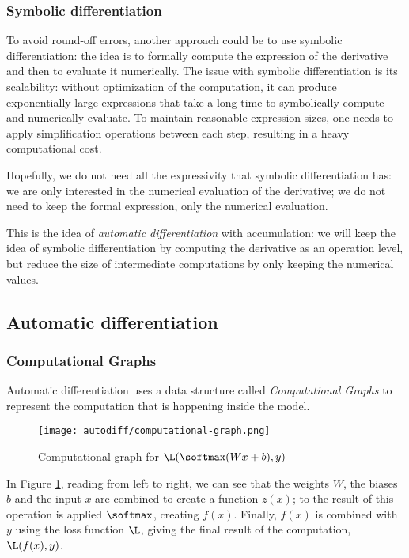 \subsubsection{Symbolic differentiation}
To avoid round-off errors, another approach could be to use symbolic differentiation: the idea is to formally compute the expression of the derivative and then to evaluate it numerically. The issue with symbolic differentiation is its scalability: without optimization of the computation, it can produce exponentially large expressions that take a long time to symbolically compute and numerically evaluate. To maintain reasonable expression sizes, one needs to apply simplification operations between each step, resulting in a heavy computational cost.

Hopefully, we do not need all the expressivity that symbolic differentiation has: we are only interested in the numerical evaluation of the derivative; we do not need to keep the formal expression, only the numerical evaluation.

This is the idea of \emph{automatic differentiation} with accumulation: we will keep the idea of symbolic differentiation by computing the derivative as an operation level, but reduce the size of intermediate computations by only keeping the numerical values.

\subsection{Automatic differentiation}
\subsubsection{Computational Graphs}
Automatic differentiation uses a data structure called \emph{Computational Graphs} to represent the computation that is happening inside the model.
\begin{figure}[H]
    \centering
    \texttt{[image: autodiff/computational-graph.png]}
    \caption{Computational graph for $\L(\softmax(Wx+b), y)$}
    \label{fig:computational-graph}
\end{figure}
In Figure \ref{fig:computational-graph}, reading from left to right, we can see that the weights $W$, the biases $b$ and the input $x$ are combined to create a function $z(x)$; to the result of this operation is applied $\softmax$, creating $f(x)$. Finally, $f(x)$ is combined with $y$ using the loss function $\L$, giving the final result of the computation, $\L(f(x), y)$.

